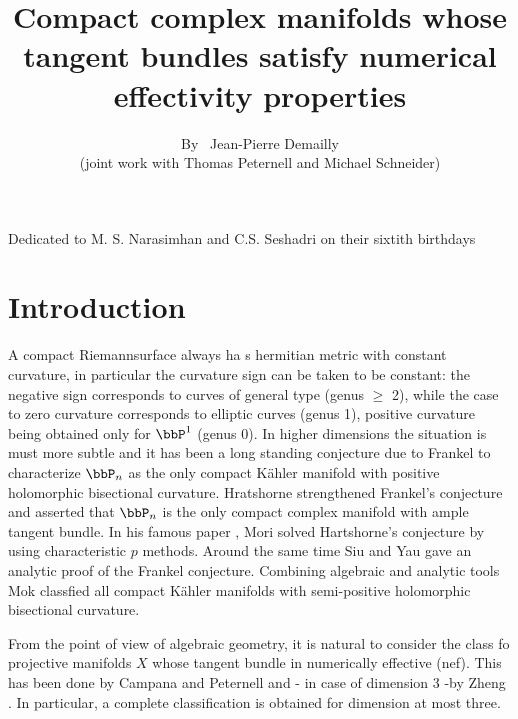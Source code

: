 \title{Compact complex manifolds whose tangent bundles satisfy numerical effectivity properties}

\author{By~ Jean-Pierre Demailly\\(joint work with Thomas Peternell and Michael Schneider)}

\date{}
\maketitle
\begin{center}
Dedicated to M. S. Narasimhan and C.S. Seshadri on their sixtith birthdays
\end{center}

\setcounter{section}{-1}
\section{Introduction}\label{art5-sec-0}
A compact Riemann\pageoriginale surface always ha s hermitian metric with constant curvature, in particular the curvature sign can be taken to be constant: the negative sign corresponds to curves of general type (genus $\geq$ 2), while the case to zero curvature corresponds to elliptic curves (genus 1), positive curvature being obtained only for $\bbP^{1}$ (genus 0). In higher dimensions the situation is must more subtle and it has been a long standing conjecture due to Frankel to characterize $\bbP_{n}$ as the only compact K\"ahler manifold with positive holomorphic bisectional curvature. Hratshorne strengthened Frankel's conjecture and asserted that $\bbP_{n}$ is the only compact complex manifold with ample tangent bundle. In his famous paper \cite{art5-keyMo79}, Mori solved Hartshorne's conjecture by using characteristic $p$ methods. Around the same time Siu and Yau \cite{SY80} gave an analytic proof of the Frankel conjecture. Combining algebraic and analytic tools Mok \cite{art5-keyMk88} classfied all compact K\"ahler manifolds with semi-positive holomorphic bisectional curvature. 

From the point of view of algebraic geometry, it is natural to consider the class fo projective manifolds $X$ whose tangent bundle in numerically effective (nef). This has been done by Campana and Peternell \cite{art5-keyCP91} and - in case of dimension 3 -by Zheng \cite{art5-keyZh90}. In particular, a complete classification is obtained for dimension at most three.

